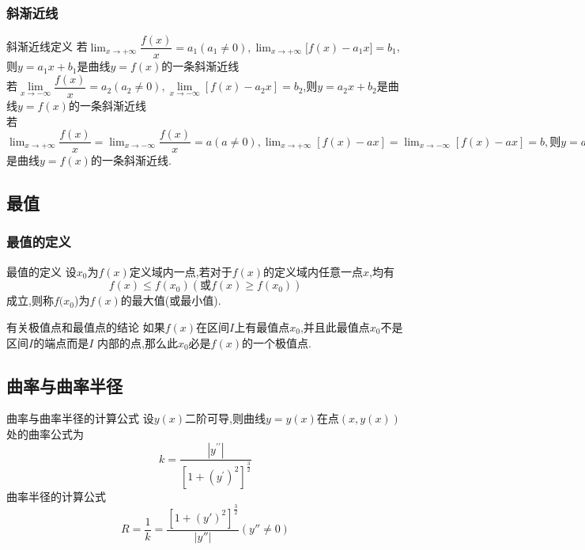 \documentclass[8pt a4paper, oneside, UTF8]{ctexbook}  %
\begin{document}
\begin{sloppypar}
    \subsubsection{斜渐近线}
        \begin{defn}{斜渐近线定义}{}
            若$\lim_{x\to+\infty}\dfrac{f(x)}{x}=a_{1}(a_{1}\neq0),\lim_{x\to+\infty}\Big[f(x)-a_{1}x\Big]=b_{1}$,则$y=a_{1}x+b_{1}$是曲线$y=f(x)$的一条斜渐近线\\
            若$\lim\limits_{x\to-\infty}\dfrac{f(x)}{x}=a_2(a_2 \neq 0),\lim\limits_{x\to-\infty}\left[f(x)-a_2x\right]=b_2$,则$y=a_2x+b_2$是曲线$y=f(x)$的一条斜渐近线\\
            若$\lim_{x\to+\infty} \dfrac{f(x)}x=\lim_{x\to-\infty}\dfrac{f(x)}x=a(a\neq0),\lim_{x\to+\infty}\left[f(x)-ax\right]=\lim_{x\to-\infty}\left[f(x)-ax\right]=b,则y=ax+b$ 是曲线$y=f(x)$的一条斜渐近线.
        \end{defn}
    \subsection{最值}
    \subsubsection{最值的定义}
    \begin{defn}{最值的定义}{}
        设$x_0$为$f(x)$定义域内一点,若对于$f(x)$的定义域内任意一点$x$,均有
        $$
            f(x)\leqslant f(x_0)(\text{或}f(x)\geqslant f(x_0))
        $$
        成立,则称$f(x_0$)为$f(x)$的最大值(或最小值).
    \end{defn}
    \begin{conclusion}{有关极值点和最值点的结论}{}
        如果$f(x)$在区间$I$上有最值点$x_0$,并且此最值点$x_0$不是区间$I$的端点而是$I$ 内部的点,那么此$x_0$必是$f(x)$的一个极值点.
    \end{conclusion}
    \subsection{曲率与曲率半径}
    \begin{defn}{曲率与曲率半径的计算公式}{}
        设$y(x)$二阶可导,则曲线$y=y(x)$在点$(x,y(x))$处的曲率公式为
        $$
            k=\dfrac{\left|y^{\prime\prime}\right|}{\left[1+(y^{\prime})^2\right]^{\frac{3}{2}}}
        $$
        曲率半径的计算公式
        $$
            R=\dfrac{1}{k}=\dfrac{\left[1+(y')^2\right]^{\frac{3}{2}}}{\left|y''\right|}(y''\neq0)
        $$
    \end{defn}
        \ifx\allfiles\undefined
    \end{sloppypar}
\end{document}
